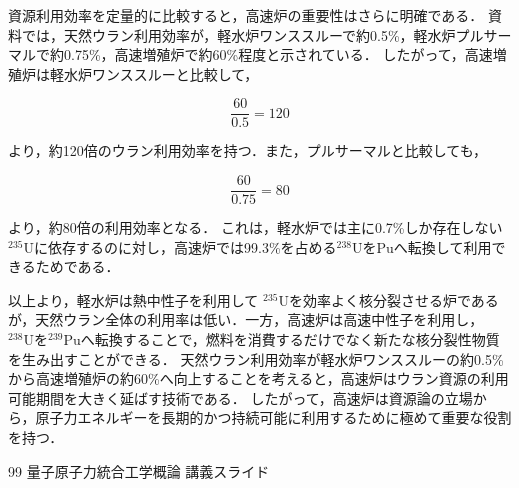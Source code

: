 \documentclass[titlepage,a4paper]{jsarticle}
\begin{document}
資源利用効率を定量的に比較すると，高速炉の重要性はさらに明確である．
資料では，天然ウラン利用効率が，軽水炉ワンススルーで約0.5\%，軽水炉プルサーマルで約0.75\%，高速増殖炉で約60\%程度と示されている．
したがって，高速増殖炉は軽水炉ワンススルーと比較して，

\[
\frac{60}{0.5}=120
\]

より，約120倍のウラン利用効率を持つ．また，プルサーマルと比較しても，

\[
\frac{60}{0.75}=80
\]

より，約80倍の利用効率となる．
これは，軽水炉では主に0.7\%しか存在しない\(^{235}\mathrm{U}\)に依存するのに対し，高速炉では99.3\%を占める\(^{238}\mathrm{U}\)をPuへ転換して利用できるためである．

以上より，軽水炉は熱中性子を利用して
\(^{235}\mathrm{U}\)を効率よく核分裂させる炉であるが，天然ウラン全体の利用率は低い．一方，高速炉は高速中性子を利用し，
\(^{238}\mathrm{U}\)を\(^{239}\mathrm{Pu}\)へ転換することで，燃料を消費するだけでなく新たな核分裂性物質を生み出すことができる．
天然ウラン利用効率が軽水炉ワンススルーの約0.5\%から高速増殖炉の約60\%へ向上することを考えると，高速炉はウラン資源の利用可能期間を大きく延ばす技術である．
したがって，高速炉は資源論の立場から，原子力エネルギーを長期的かつ持続可能に利用するために極めて重要な役割を持つ．

\begin{thebibliography}{99}
量子原子力統合工学概論 講義スライド
\end{thebibliography}
\end{document}
